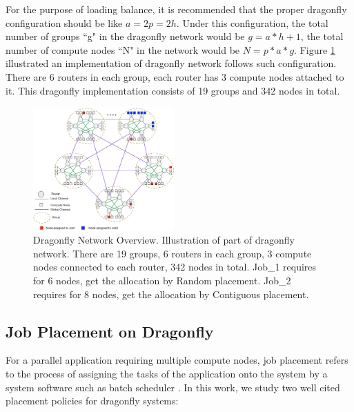 \documentclass[conference,compsoc]{IEEEtran}
\begin{document}
For the purpose of loading balance, it is recommended that the proper dragonfly configuration should be like $a=2p=2h$\cite{kim-micro}. Under this configuration, the total number of groups ``g" in the dragonfly network would be $g = a*h+1 $, the total number of compute nodes ``N" in the network would be $N = p*a*g $. Figure \ref{fig:dragonfly-overview} illustrated an implementation of dragonfly network follows such configuration. There are 6 routers in each group, each router has 3 compute nodes attached to it. This dragonfly implementation consists of 19 groups and 342 nodes in total.

\begin{figure}[h!] 
  \centering
  \includegraphics[width=0.48\textwidth]{dragonfly-overview}
  \caption{Dragonfly Network Overview. Illustration of part of dragonfly network. There are 19 groups, 6 routers in each group, 3 compute nodes connected to each router, 342 nodes in total. Job\_1 requires for 6 nodes, get the allocation by Random placement. Job\_2 requires for 8 nodes, get the allocation by Contiguous placement. }
  \label{fig:dragonfly-overview}
\end{figure}


\subsection{Job Placement on Dragonfly}
\label{sec:placement-schemes}

For a parallel application requiring multiple compute nodes, job placement refers to the process of assigning the tasks of the application onto the system by a system software such as batch scheduler \cite{xu-cluster14}. In this work, we study two well cited placement policies for dragonfly systems: 

\end{document}
